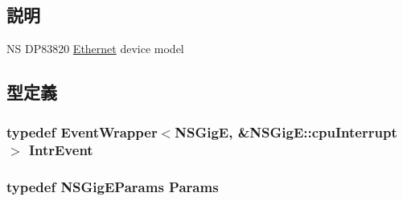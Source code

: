 \subsection{説明}
NS DP83820 \hyperlink{namespaceEthernet}{Ethernet} device model 

\subsection{型定義}
\hypertarget{classNSGigE_ae1de6e495f71d1ee11882b86bde201d4}{
\subsubsection[{IntrEvent}]{\setlength{\rightskip}{0pt plus 5cm}typedef {\bf EventWrapper}$<${\bf NSGigE}, \&NSGigE::cpuInterrupt$>$ {\bf IntrEvent}}}
\label{classNSGigE_ae1de6e495f71d1ee11882b86bde201d4}
\hypertarget{classNSGigE_a3d96e676dc626c146631b6fa53a9d823}{
\subsubsection[{Params}]{\setlength{\rightskip}{0pt plus 5cm}typedef NSGigEParams {\bf Params}}}
\label{classNSGigE_a3d96e676dc626c146631b6fa53a9d823}


